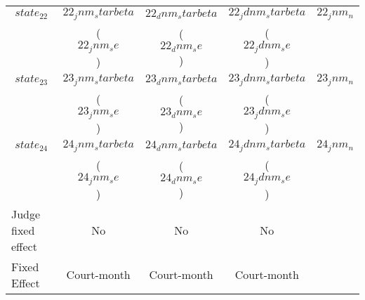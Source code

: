 {\begin{tabular}{l*{4}{c}}
$$state_22$$ \hspace{15mm} & $$22_jnm_starbeta$$ & $$22_dnm_starbeta$$ & $$22_jdnm_starbeta$$ & $$22_jnm_n$$ \\
                           & ($$22_jnm_se$$)     & ($$22_dnm_se$$)     & ($$22_jdnm_se$$)                    \\[2.5mm]
\hline

$$state_23$$ \hspace{15mm} & $$23_jnm_starbeta$$ & $$23_dnm_starbeta$$ & $$23_jdnm_starbeta$$ & $$23_jnm_n$$ \\
                           & ($$23_jnm_se$$)     & ($$23_dnm_se$$)     & ($$23_jdnm_se$$)                    \\[2.5mm]
\hline

$$state_24$$ \hspace{15mm} & $$24_jnm_starbeta$$ & $$24_dnm_starbeta$$ & $$24_jdnm_starbeta$$ & $$24_jnm_n$$ \\
                           & ($$24_jnm_se$$)     & ($$24_dnm_se$$)     & ($$24_jdnm_se$$)                    \\[2.5mm]
\hline

Judge fixed effect & No          & No          & No          \\
Fixed Effect       & Court-month & Court-month & Court-month \\
\hline\hline
\end{tabular}
}
 
